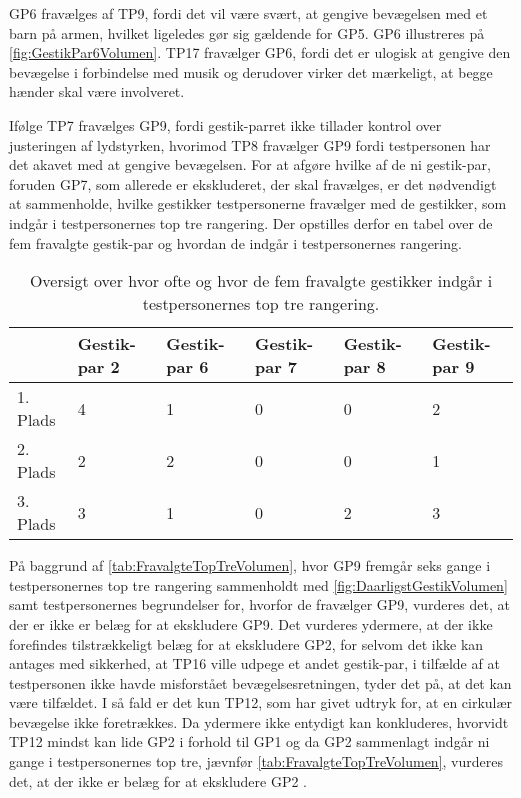 GP6 fravælges af TP9, fordi det vil være svært, at gengive bevægelsen med et barn på armen, hvilket ligeledes gør sig gældende for GP5. GP6 illustreres på \autoref{fig:GestikPar6Volumen}. TP17 fravælger GP6, fordi det er ulogisk at gengive den bevægelse i forbindelse med musik og derudover virker det mærkeligt, at begge hænder skal være involveret. 

Ifølge TP7 fravælges GP9, fordi gestik-parret ikke tillader kontrol over justeringen af lydstyrken, hvorimod TP8 fravælger GP9 fordi testpersonen har det akavet med at gengive bevægelsen.\blankline
%
For at afgøre hvilke af de ni gestik-par, foruden GP7, som allerede er ekskluderet, der skal fravælges, er det nødvendigt at sammenholde, hvilke gestikker testpersonerne fravælger med de gestikker, som indgår i testpersonernes top tre rangering. Der opstilles derfor en tabel over de fem fravalgte gestik-par og hvordan de indgår i testpersonernes rangering.    
%
\begin{table}[H]
	\centering
	\begin{tabular}{ | p{1.5cm} | p{2.1cm} | p{2.1cm} | p{2.1cm} | p{2.1cm} | p{2.1cm} |}
	\hline
		 & Gestik-par 2 & Gestik-par 6 & Gestik-par 7 & Gestik-par 8 & Gestik-par 9 \\ \hline
		1. Plads & 4 & 1 & 0 & 0 & 2\\ \hline
		2. Plads & 2 & 2 & 0 & 0 & 1\\ \hline
		3. Plads & 3 & 1 & 0 & 2 & 3\\ \hline
	\end{tabular}
	\caption{Oversigt over hvor ofte og hvor de fem fravalgte gestikker indgår i testpersonernes top tre rangering.}
	\label{tab:FravalgteTopTreVolumen}
\end{table}
\noindent
%
På baggrund af \autoref{tab:FravalgteTopTreVolumen}, hvor GP9 fremgår seks gange i testpersonernes top tre rangering sammenholdt med \autoref{fig:DaarligstGestikVolumen} samt testpersonernes begrundelser for, hvorfor de fravælger GP9, vurderes det, at der er ikke er belæg for at ekskludere GP9. Det vurderes ydermere, at der ikke forefindes tilstrækkeligt belæg for at ekskludere GP2, for selvom det ikke kan antages med sikkerhed, at TP16 ville udpege et andet gestik-par, i tilfælde af at testpersonen ikke havde misforstået bevægelsesretningen, tyder det på, at det kan være tilfældet. I så fald er det kun TP12, som har givet udtryk for, at en cirkulær bevægelse ikke foretrækkes. Da ydermere ikke entydigt kan konkluderes, hvorvidt TP12 mindst kan lide GP2 i forhold til GP1 og da GP2 sammenlagt indgår ni gange i testpersonernes top tre, jævnfør \autoref{tab:FravalgteTopTreVolumen}, vurderes det, at der ikke er belæg for at ekskludere GP2 .
